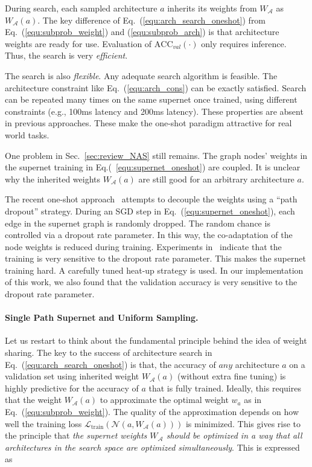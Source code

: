 During search, each sampled architecture $a$ inherits its weights from $W_\mathcal{A}$ as $W_\mathcal{A}(a)$. The key difference of Eq.~(\ref{equ:arch_search_oneshot}) from Eq.~(\ref{equ:subprob_weight}) and (\ref{equ:subprob_arch}) is that architecture weights are ready for use. Evaluation of $\text{ACC}_{val}(\cdot)$ only requires inference. Thus, the search is very \emph{efficient}. 

The search is also \emph{flexible}. Any adequate search algorithm is feasible. The architecture constraint like Eq.~(\ref{equ:arch_cons}) can be exactly satisfied. Search can be repeated many times on the same supernet once trained, using different constraints (e.g., 100ms latency and 200ms latency). These properties are absent in previous approaches. These make the one-shot paradigm attractive for real world tasks.

One problem in Sec.~\ref{sec:review_NAS} still remains. The graph nodes' weights in the supernet training in Eq.(~\ref{equ:supernet_oneshot}) are coupled. It is unclear why the inherited weights $W_\mathcal{A}(a)$ are still good for an arbitrary architecture $a$.

The recent one-shot approach~\cite{bender2018understanding} attempts to decouple the weights using a ``path dropout'' strategy. During an SGD step in Eq.~(\ref{equ:supernet_oneshot}), each edge in the supernet graph is randomly dropped. The random chance is controlled via a dropout rate parameter. In this way, the co-adaptation of the node weights is reduced during training. Experiments in~\cite{bender2018understanding} indicate that the training is very sensitive to the dropout rate parameter. This makes the supernet training hard. A carefully tuned heat-up strategy is used. In our implementation of this work, we also found that the validation accuracy is very sensitive to the dropout rate parameter.

\paragraph{Single Path Supernet and Uniform Sampling. } Let us restart to think about the fundamental principle behind the idea of weight sharing. The key to the success of architecture search in Eq.~(\ref{equ:arch_search_oneshot}) is that, the accuracy of $any$ architecture $a$ on a validation set using inherited weight $W_\mathcal{A}(a)$ (without extra fine tuning) is highly predictive for the accuracy of $a$ that is fully trained. Ideally, this requires that the weight $W_\mathcal{A}(a)$ to approximate the optimal weight $w_a$ as in Eq.~(\ref{equ:subprob_weight}). The quality of the approximation depends on how well the training loss $\mathcal{L}_\text{train}\left( \mathcal{N}(a, W_\mathcal{A}(a)) \right)$ is minimized. This gives rise to the principle that \emph{the supernet weights $W_\mathcal{A}$ should be optimized in a way that all architectures in the search space are optimized simultaneously}. This is expressed as

